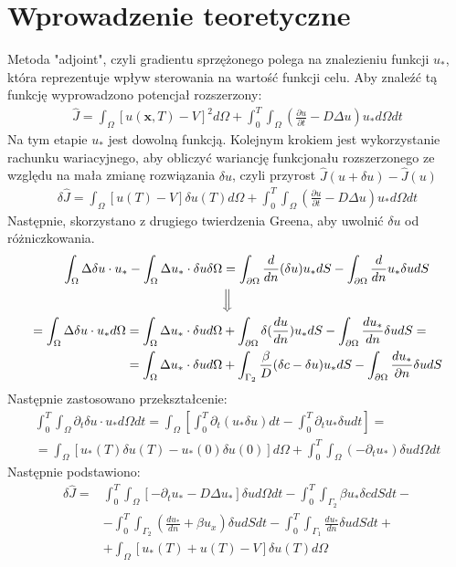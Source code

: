 \documentclass{article}
\begin{document}
\section{Wprowadzenie teoretyczne}
Metoda "adjoint", czyli gradientu sprzężonego polega na znalezieniu funkcji $u_*$, która reprezentuje wpływ sterowania na wartość funkcji celu. Aby znaleźć tą funkcję wyprowadzono potencjał rozszerzony:
\begin{align*}
	\hat{J} = \int_{\Omega}[u(\textbf{x},T)-V]^2d\Omega + \int_{0}^{T}\int_\Omega(	\frac{\partial u}{\partial t}-D\Delta u)u_* d\Omega dt
\end{align*}
Na tym etapie $u_*$ jest dowolną funkcją. Kolejnym krokiem jest wykorzystanie rachunku wariacyjnego, aby obliczyć wariancję funkcjonału rozszerzonego ze względu na mała zmianę rozwiązania $\delta u$, czyli przyrost $\hat{J}(u+\delta u) - \hat{J}(u)$
\begin{align*}
	\delta\hat{J} = \int_{\Omega}[u(T)-V]\delta u(T)d\Omega + \int_{0}^T\int_{\Omega}(	\frac{\partial u}{\partial t}-D\Delta u)u_*d\Omega dt
\end{align*}
Następnie, skorzystano z drugiego twierdzenia Greena, aby uwolnić  $\delta u$ od różniczkowania.
\begin{align*}
	\int_{\Omega}\Delta\delta u\cdot u_* - \int_{\Omega}\Delta u_*\cdot\delta u\delta\Omega &= \int_{\partial\Omega}\frac{d}{dn}(\delta u)u_* dS-\int_{\partial\Omega}\frac{d}{dn}u_*\delta u dS\\
	&\Big\Downarrow\\
	=\int_{\Omega}\Delta\delta u \cdot u_* d\Omega = \int_{\Omega}\Delta u_*\cdot \delta u d \Omega &+ \int_{\partial\Omega}\delta(\frac{du}{dn})u_* dS - \int_{\partial\Omega}\frac{du_*}{dn}\delta u dS=\\
	=\int_{\Omega}\Delta u_*\cdot \delta u d\Omega &+ \int_{\Gamma_2}\frac{\beta}{D}(\delta c - \delta u)u_*dS - \int_{\partial\Omega}\frac{du_*}{\partial n}\delta u dS
\end{align*}
Następnie zastosowano przekształcenie:
\begin{align*}
	\int_{0}^{T}\int_{\Omega}\partial_t\delta u \cdot u_* d\Omega dt = \int_{\Omega}[\int_{0}^{T}\partial_t(u_*\delta u)dt - \int_{0}^{T}\partial_t u_* \delta u dt]=\\
	=\int_{\Omega}[u_*(T)\delta u(T)-u_*(0)\delta u(0)]d\Omega + \int_{0}^{T}\int_{\Omega}(-\partial_t u_*)\delta u d\Omega dt
\end{align*}
Następnie podstawiono:
\begin{align*}
	\delta \hat{J} =& \int_{0}^{T}\int_{\Omega}[-\partial_t u_*-D\Delta u_*]\delta u d\Omega dt - \int_{0}^{T}\int_{\Gamma_2}\beta u_*\delta c dSdt- \\
	&-\int_{0}^{T}\int_{\Gamma_2}(\frac{du_*}{dn}+\beta u_x)\delta u dSdt - \int_{0}^{T}\int_{\Gamma_1}\frac{du_*}{dn}\delta u dSdt+\\
	&+ \int_{\Omega}[u_*(T)+u(T)-V]\delta u(T)d\Omega
\end{align*}
\end{document}
